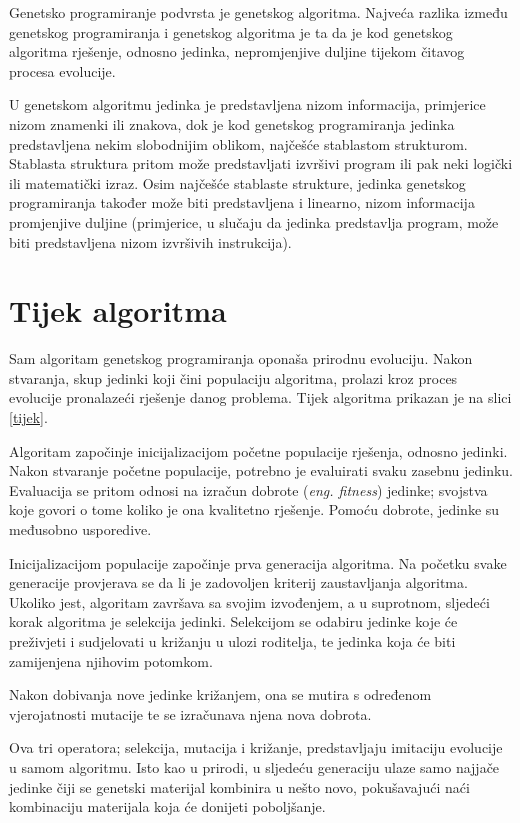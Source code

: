 Genetsko programiranje podvrsta je genetskog algoritma. Najveća razlika između genetskog programiranja i genetskog algoritma je ta da je kod genetskog algoritma rješenje, odnosno jedinka, nepromjenjive duljine tijekom čitavog procesa evolucije.

U genetskom algoritmu jedinka je predstavljena nizom informacija, primjerice nizom znamenki ili znakova, dok je kod genetskog programiranja jedinka predstavljena nekim slobodnijim oblikom, najčešće stablastom strukturom. Stablasta struktura pritom može predstavljati izvršivi program ili pak neki logički ili matematički izraz. Osim najčešće stablaste strukture, jedinka genetskog programiranja također može biti predstavljena i linearno, nizom informacija promjenjive duljine (primjerice, u slučaju da jedinka predstavlja program, može biti predstavljena nizom izvršivih instrukcija).

\section{Tijek algoritma}

Sam algoritam genetskog programiranja oponaša prirodnu evoluciju. Nakon stvaranja, skup jedinki koji čini populaciju algoritma, prolazi kroz proces evolucije pronalazeći rješenje danog problema. Tijek algoritma prikazan je na slici \ref{tijek}.

Algoritam započinje inicijalizacijom početne populacije rješenja, odnosno jedinki. Nakon stvaranje početne populacije, potrebno je evaluirati svaku zasebnu jedinku. Evaluacija se pritom odnosi na izračun dobrote (\textit{eng. fitness}) jedinke; svojstva koje govori o tome koliko je ona kvalitetno rješenje. Pomoću dobrote, jedinke su međusobno usporedive.

Inicijalizacijom populacije započinje prva generacija algoritma. Na početku svake generacije provjerava se da li je zadovoljen kriterij zaustavljanja algoritma. Ukoliko jest, algoritam završava sa svojim izvođenjem, a u suprotnom, sljedeći korak algoritma je selekcija jedinki. 
Selekcijom se odabiru jedinke koje će preživjeti i sudjelovati u križanju u ulozi roditelja, te jedinka koja će biti zamijenjena njihovim potomkom.

Nakon dobivanja nove jedinke križanjem, ona se mutira s određenom vjerojatnosti mutacije te se izračunava njena nova dobrota.

Ova tri operatora; selekcija, mutacija i križanje, predstavljaju imitaciju evolucije u samom algoritmu. Isto kao u prirodi, u sljedeću generaciju ulaze samo najjače jedinke čiji se genetski materijal kombinira u nešto novo, pokušavajući naći kombinaciju materijala koja će donijeti poboljšanje.


